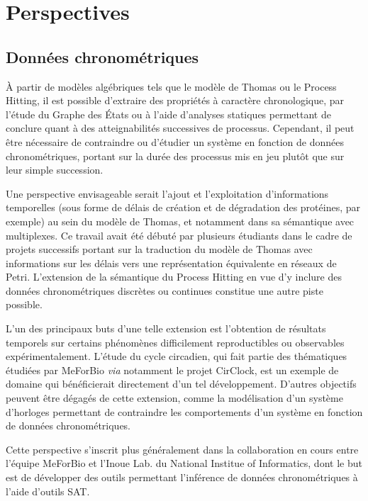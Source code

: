 \chapter{Perspectives}
\label{chap:perspectives}

\section{Données chronométriques}

À partir de modèles algébriques tels que le modèle de Thomas ou le Process Hitting, il est possible d'extraire des propriétés à caractère chronologique,
par l'étude du Graphe des États ou à l'aide d'analyses statiques permettant de conclure quant à des atteignabilités successives de processus.
Cependant, il peut être nécessaire de contraindre ou d'étudier un système en fonction de données chronométriques, portant sur la durée des processus mis en jeu plutôt que sur leur simple succession.

Une perspective envisageable serait l'ajout et l'exploitation d'informations temporelles (sous forme de délais de création et de dégradation des protéines, par exemple) au sein du modèle de Thomas, et notamment dans sa sémantique avec multiplexes.
Ce travail avait été débuté par plusieurs étudiants dans le cadre de projets successifs portant sur la traduction du modèle de Thomas avec informations sur les délais vers une représentation équivalente en réseaux de Petri.
L'extension de la sémantique du Process Hitting en vue d'y inclure des données chronométriques discrètes ou continues constitue une autre piste possible.

L'un des principaux buts d'une telle extension est l'obtention de résultats temporels sur certains phénomènes difficilement reproductibles ou observables expérimentalement.
L'étude du cycle circadien, qui fait partie des thématiques étudiées par MeForBio \textit{via} notamment le projet CirClock, est un exemple de domaine qui bénéficierait directement d'un tel développement.
D'autres objectifs peuvent être dégagés de cette extension, comme la modélisation d'un système d'horloges permettant de contraindre les comportements d'un système en fonction de données chronométriques.

Cette perspective s'inscrit plus généralement dans la collaboration en cours entre l'équipe MeForBio et l'Inoue Lab. du National Institue of Informatics,
dont le but est de développer des outils permettant l'inférence de données chronométriques à l'aide d'outils SAT.



